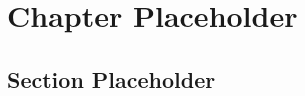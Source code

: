\documentclass[11pt]{book}
\begin{document}
\frontmatter
\tableofcontents

\mainmatter




\chapter{Chapter Placeholder}
\label{ch:placeholder}

\section{Section Placeholder}
\label{sec:placeholder}
\end{document}
